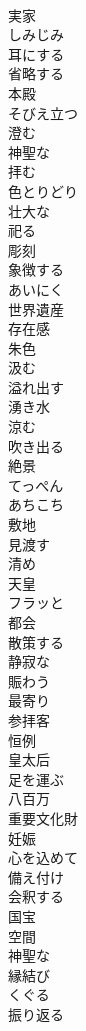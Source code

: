 \documentclass[8pt]{extreport}
\begin{document}
\begin{CJK}{UTF8}{min}
\\	実家
\\	しみじみ
\\	耳にする
\\	省略する
\\	本殿
\\	そびえ立つ
\\	澄む
\\	神聖な
\\	拝む
\\	色とりどり
\\	壮大な
\\	祀る
\\	彫刻
\\	象徴する
\\	あいにく
\\	世界遺産
\\	存在感
\\	朱色
\\	汲む
\\	溢れ出す
\\	湧き水
\\	涼む
\\	吹き出る
\\	絶景
\\	てっぺん
\\	あちこち
\\	敷地
\\	見渡す
\\	清め
\\	天皇
\\	フラッと
\\	都会
\\	散策する
\\	静寂な
\\	賑わう
\\	最寄り
\\	参拝客
\\	恒例
\\	皇太后
\\	足を運ぶ
\\	八百万
\\	重要文化財
\\	妊娠
\\	心を込めて
\\	備え付け
\\	会釈する
\\	国宝
\\	空間
\\	神聖な
\\	縁結び
\\	くぐる
\\	振り返る

\end{CJK}
\end{document}
